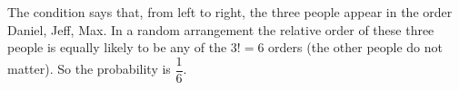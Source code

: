 The condition says that, from left to right, the three people appear in the order Daniel, Jeff, Max. In a random arrangement the relative order of these three people is equally likely to be any of the $3!=6$ orders (the other people do not matter). So the probability is $\boxed{\dfrac{1}{6}}$.
